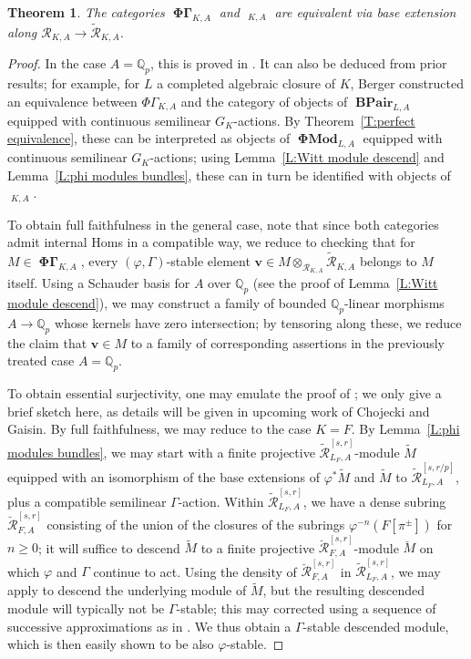 \documentclass[12pt]{amsart}
\newtheorem{theorem}{Theorem}[section]
\theoremstyle{definition}
\numberwithin{equation}{theorem}
\newcommand{\bv}{\mathbf{v}}
\newcommand{\QQ}{\mathbb{Q}}
\newcommand{\calR}{\mathcal{R}}
\DeclareMathOperator{\BPair}{\mathbf{BPair}}
\DeclareMathOperator{\PhiGamma}{\mathbf{\Phi \Gamma}}
\DeclareMathOperator{\PhiGammatilde}{\widetilde{\mathbf{\Phi \Gamma}}}
\DeclareMathOperator{\PhiMod}{\mathbf{\Phi Mod}}
\begin{document}
\begin{theorem} \label{T:tilde no tilde}
The categories $\PhiGamma_{K,A}$ and $\PhiGammatilde_{K,A}$ are equivalent via base extension along $\calR_{K,A} \to \tilde{\calR}_{K,A}$.
\end{theorem}
\begin{proof}
In the case $A = \QQ_p$, this is proved in \cite[Theorem~6.1.7]{kedlaya-liu2}.
It can also be deduced from prior results; for example, for $L$ a completed algebraic closure of $K$, Berger \cite[Th\'eor\`eme~A]{berger-b-pairs} constructed an equivalence between $\Phi\Gamma_{K,A}$ and the category of objects of $\BPair_{L,A}$ equipped with continuous semilinear $G_K$-actions. By Theorem~\ref{T:perfect equivalence}, these can be interpreted as objects of $\PhiMod_{L,A}$ equipped with continuous semilinear $G_K$-actions;
using Lemma~\ref{L:Witt module descend} and Lemma~\ref{L:phi modules bundles}, these can in turn be identified with objects of $\PhiGammatilde_{K,A}$.

To obtain full faithfulness in the general case, note that since both categories admit internal Homs in a compatible way, we reduce to checking that for $M \in \PhiGamma_{K,A}$, every $(\varphi, \Gamma)$-stable element $\bv \in M \otimes_{\calR_{K,A}} \tilde{\calR}_{K,A}$ belongs to $M$ itself. Using a Schauder basis for $A$ over $\QQ_p$ (see the proof of Lemma~\ref{L:Witt module descend}), we may construct a family of bounded $\QQ_p$-linear morphisms
$A \to \QQ_p$ whose kernels have zero intersection; by tensoring along these, we reduce the claim that $\bv \in M$ to a family of corresponding assertions in the previously treated case $A = \QQ_p$.

To obtain essential surjectivity, one may emulate the proof of \cite[Theorem~6.1.7]{kedlaya-liu2}; we only give a brief sketch here, as details will be given in upcoming work of Chojecki and Gaisin. By full faithfulness, we may reduce to the case $K = F$.
By Lemma~\ref{L:phi modules bundles}, we may start with a finite projective $\tilde{\calR}^{[s,r]}_{L_F,A}$-module $\tilde{M}$ equipped with an isomorphism of the base extensions of $\varphi^* \tilde{M}$ and $\tilde{M}$ to $\tilde{\calR}^{[s,r/p]}_{L_F,A}$, plus a compatible semilinear $\Gamma$-action.
Within $\tilde{\calR}^{[s,r]}_{L_F,A}$, we have a dense subring $\breve{\calR}^{[s,r]}_{F,A}$ consisting of the union of the closures of
the subrings $\varphi^{-n}(F[\pi^{\pm}])$ for $n \geq 0$; it will suffice to descend $\tilde{M}$ to a finite projective $\breve{\calR}^{[s,r]}_{F,A}$-module $\breve{M}$
on which $\varphi$ and $\Gamma$ continue to act. Using the density of
$\breve{\calR}^{[s,r]}_{F,A}$ in $\tilde{\calR}^{[s,r]}_{L_F,A}$, we may apply
\cite[Lemma 5.6.8]{kedlaya-liu2} to descend the underlying module of $\tilde{M}$, but the resulting descended module will typically not be $\Gamma$-stable; this may corrected using a sequence of successive approximations as in \cite[Lemma 5.6.9]{kedlaya-liu2}. We thus obtain a $\Gamma$-stable descended module, which is then easily shown to be also $\varphi$-stable.
\end{proof}
\end{document}
